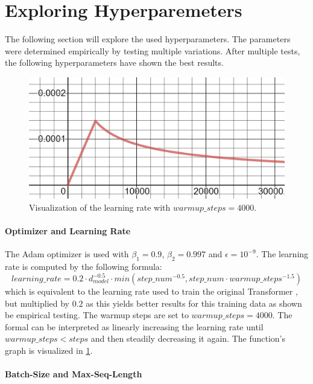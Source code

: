 
\section{Exploring Hyperparemeters}

The following section will explore the used hyperparameters.
The parameters were determined empirically by testing multiple variations.
After multiple tests, the following hyperparameters have shown the best results.

\begin{figure}[h]
\centering
\includegraphics[width=0.6\paperwidth]{figures/learning-rate}
\caption{Visualization of the learning rate with $warmup\_steps = 4000$.}
\label{fig:learning-rate}
\end{figure}

\paragraph{Optimizer and Learning Rate}

The Adam optimizer \cite{article} is used with $\beta_1=0.9$, $\beta_2=0.997$ and $\epsilon = 10^{-9}$.
The learning rate is computed by the following formula:
\[
	learning\_rate = 0.2 \cdot d_{model}^{-0.5} \cdot min(step\_num^{-0.5}, step\_num \cdot warmup\_steps^{-1.5})
\]
which is equivalent to the learning rate used to train the original Transformer \cite[p.~7]{1706.03762}, but multiplied by $0.2$ as this yields better results for this training data as shown be empirical testing.
The warmup steps are set to $warmup\_steps = 4000$.
The formal can be interpreted as linearly increasing the learning rate until $warmup\_steps < steps$ and then steadily decreasing it again.
The function's graph is visualized in \cref{fig:learning-rate}.

\paragraph{Batch-Size and Max-Seq-Length}

